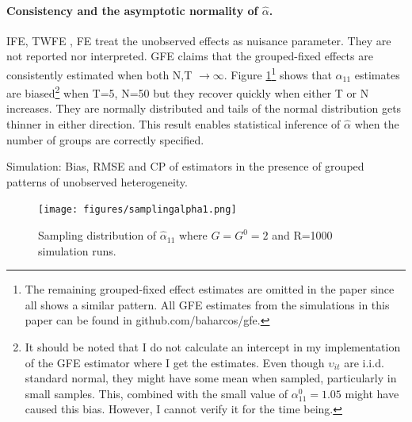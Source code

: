 \paragraph{Consistency and the asymptotic normality of $\hat{\alpha}$.} %
IFE, TWFE
, FE treat the unobserved effects as nuisance parameter. They are not reported nor interpreted. GFE claims that the grouped-fixed effects are consistently estimated when both N,T $\to \infty$. %
Figure \ref{fig:alpha11}\footnote{The remaining grouped-fixed effect estimates are omitted in the paper since all shows a similar pattern. All GFE estimates from the simulations in this paper can be found in github.com/baharcos/gfe.} shows that $\alpha_{11}$ estimates are biased\footnote{It should be noted that I do not calculate an intercept in my implementation of the GFE estimator where I get the estimates. Even though $\upsilon_{it}$ are i.i.d. standard normal, they might have some mean when sampled, particularly in small samples. This, combined with the small value of $\alpha_{11}^0 = 1.05$ might have caused this bias. However, I cannot verify it for the time being.} when T=5, N=50 but they recover quickly when either T or N increases. They are normally distributed and tails of the normal distribution gets thinner in either direction. This result enables statistical inference of $\hat{\alpha}$ when the number of groups are correctly specified. %



\begin{table}[p]
    \centering
    \caption{Simulation: Bias, RMSE and CP of estimators in the presence of grouped patterns of unobserved heterogeneity.}
    
    \label{tab:table0}
\end{table}

\begin{figure}[h]
\centering
\texttt{[image: figures/samplingalpha1.png]}
\caption{Sampling distribution of $\hat{\alpha}_{11}$ where $G = G^0 = 2$ and R=1000 simulation runs.}
\label{fig:alpha11}
\end{figure}


